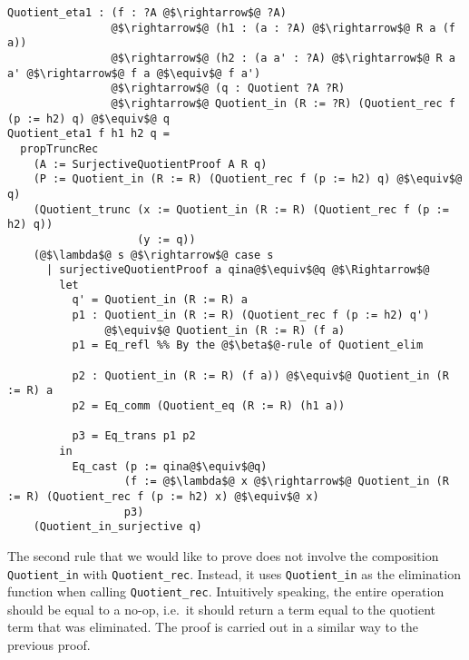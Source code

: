 \documentclass[12pt,twoside,maitrise]{dms}
\theoremstyle{definition}
\numberwithin{equation}{section}
\numberwithin{table}{chapter}
\numberwithin{figure}{chapter}
\newcommand\id[1] {\texttt{#1}}
\begin{document}
\begin{verbatim}
Quotient_eta1 : (f : ?A @$\rightarrow$@ ?A)
                @$\rightarrow$@ (h1 : (a : ?A) @$\rightarrow$@ R a (f a))
                @$\rightarrow$@ (h2 : (a a' : ?A) @$\rightarrow$@ R a a' @$\rightarrow$@ f a @$\equiv$@ f a')
                @$\rightarrow$@ (q : Quotient ?A ?R)
                @$\rightarrow$@ Quotient_in (R := ?R) (Quotient_rec f (p := h2) q) @$\equiv$@ q
Quotient_eta1 f h1 h2 q =
  propTruncRec
    (A := SurjectiveQuotientProof A R q)
    (P := Quotient_in (R := R) (Quotient_rec f (p := h2) q) @$\equiv$@ q)
    (Quotient_trunc (x := Quotient_in (R := R) (Quotient_rec f (p := h2) q))
                    (y := q))
    (@$\lambda$@ s @$\rightarrow$@ case s
      | surjectiveQuotientProof a qina@$\equiv$@q @$\Rightarrow$@
        let
          q' = Quotient_in (R := R) a
          p1 : Quotient_in (R := R) (Quotient_rec f (p := h2) q')
               @$\equiv$@ Quotient_in (R := R) (f a)
          p1 = Eq_refl %% By the @$\beta$@-rule of Quotient_elim

          p2 : Quotient_in (R := R) (f a)) @$\equiv$@ Quotient_in (R := R) a
          p2 = Eq_comm (Quotient_eq (R := R) (h1 a))

          p3 = Eq_trans p1 p2
        in
          Eq_cast (p := qina@$\equiv$@q)
                  (f := @$\lambda$@ x @$\rightarrow$@ Quotient_in (R := R) (Quotient_rec f (p := h2) x) @$\equiv$@ x)
                  p3)
    (Quotient_in_surjective q)
\end{verbatim}

The second rule that we would like to prove does not involve the composition
\id{Quotient\_in} with \id{Quotient\_rec}. Instead, it uses \id{Quotient\_in} as
the elimination function when calling \id{Quotient\_rec}. Intuitively speaking,
the entire operation should be equal to a no-op, i.e.\ it should return a term
equal to the quotient term that was eliminated. The proof is carried out in a
similar way to the previous proof.
\end{document}
